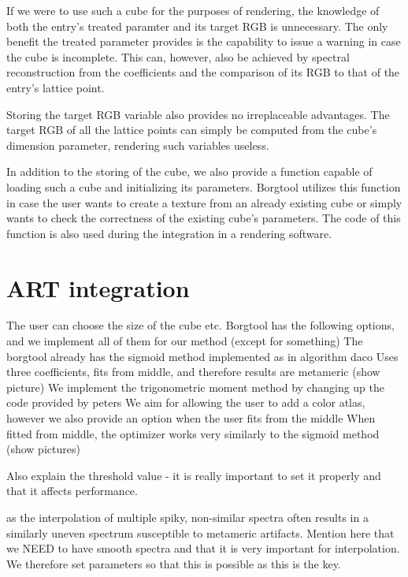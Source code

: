 If we were to use such a cube for the purposes of rendering, the knowledge of both the entry's treated paramter and its target RGB is unnecessary. The only benefit the treated parameter provides is the capability to issue a warning in case the cube is incomplete. This can, however, also be achieved by spectral reconstruction from the coefficients and the comparison of its RGB to that of the entry's lattice point.

Storing the target RGB variable also provides no irreplaceable advantages. The target RGB of all the lattice points can simply be computed from the cube's dimension parameter, rendering such variables useless.

In addition to the storing of the cube, we also provide a function capable of loading such a cube and initializing its parameters. Borgtool utilizes this function in case the user wants to create a texture from an already existing cube or simply wants to check the correctness of the existing cube's parameters. The code of this function is also used during the integration in a rendering software.

\section{ART integration}

The user can choose the size of the cube etc. Borgtool has the following options, and we implement all of them for our method (except for something)
The borgtool already has the sigmoid method implemented as in algorithm daco
Uses three coefficients, fits from middle, and therefore results are metameric (show picture)
We implement the trigonometric moment method by changing up the code provided by peters
We aim for allowing the user to add a color atlas, however we also provide an option when the user fits from the middle
When fitted from middle, the optimizer works very similarly to the sigmoid method (show pictures)

Also explain the threshold value - it is really important to set it properly and that it affects performance.


 as the interpolation of multiple spiky, non-similar spectra often results in a similarly uneven spectrum susceptible to metameric artifacts. Mention here that we NEED to have smooth spectra and that it is very important for interpolation. We therefore set parameters so that this is possible as this is the key. 
